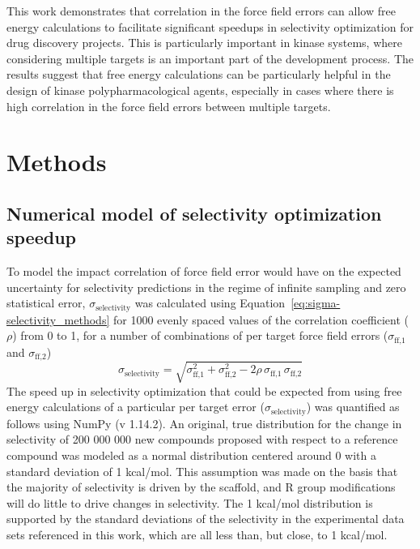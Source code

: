 \documentclass[phd,tocprelim]{cornell}
\begin{document}
This work demonstrates that correlation in the force field errors can allow free energy calculations to facilitate significant speedups in selectivity optimization for drug discovery projects. This is particularly important in kinase systems, where considering multiple targets is an important part of the development process. The results suggest that free energy calculations can be particularly helpful in the design of kinase polypharmacological agents, especially in cases where there is high correlation in the force field errors between multiple targets. 



\section{Methods}

\subsection{Numerical model of selectivity optimization speedup}
To model the impact correlation of force field error would have on the expected uncertainty for selectivity predictions in the regime of infinite sampling and zero statistical error, $\sigma_\text{selectivity}$ was calculated using Equation~\ref{eq:sigma-selectivity_methods} for 1000 evenly spaced values of the correlation coefficient ($\rho$) from 0 to 1, for a number of combinations of per target force field errors ($\sigma_\text{ff,1}$ and $\sigma_\text{ff,2}$) 
\begin{equation}\label{eq:sigma-selectivity_methods}
\sigma_\text{selectivity} = \sqrt{\sigma_\text{ff,1}^2 + \sigma_\text{ff,2}^2 - 2 \rho \, \sigma_\text{ff,1} \, \sigma_\text{ff,2}}
\end{equation}
The speed up in selectivity optimization that could be expected from using free energy calculations of a particular per target error ($\sigma_\text{selectivity}$) was quantified as follows using NumPy (v 1.14.2). 
An original, true distribution for the change in selectivity of 200 000 000 new compounds proposed with respect to a reference compound was modeled as a normal distribution centered around 0 with a standard deviation of 1 kcal/mol. 
This assumption was made on the basis that the majority of selectivity is driven by the scaffold, and R group modifications will do little to drive changes in selectivity. The 1 kcal/mol distribution is supported by the standard deviations of the selectivity in the experimental data sets referenced in this work, which are all less than, but close, to 1 kcal/mol. 
\end{document}
